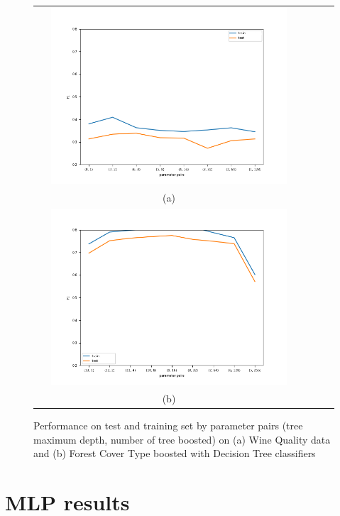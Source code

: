 \documentclass{article}
\begin{document}
\begin{figure} [H]
    \centering
    \begin{tabular}{cccc}
    \includegraphics[width=0.9\textwidth]{Results_Tree/tree-wine-boosted_f1.png}\\
    (a) \\[6pt]
    \includegraphics[width=0.9\textwidth]{Results_Tree/tree-covtype_balanced-boosted_f1.png}\\ (b)  \\[6pt]
    \end{tabular}
    \caption{Performance on test and training set by parameter pairs (tree maximum depth, number of tree boosted) on (a) Wine Quality data and (b) Forest Cover Type boosted with Decision Tree classifiers}
    \label{fig:Tree_results}
\end{figure}

\section{MLP results}
\label{Appendice_MLP}
\end{document}
